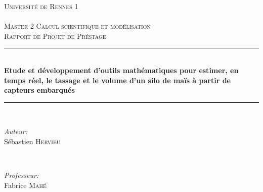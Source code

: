 \documentclass[12pt,a4paper]{report}
\author{Sébastien Hervieu}
\begin{document}
\begin{titlepage}

\newcommand{\HRule}{\rule{\linewidth}{0.5mm}} %

\center %
 

\textsc{\LARGE Université de Rennes 1}\\[1cm] 
\textsc{\Large }\\[0.5cm] %
\textsc{\large Master 2 Calcul scientifique et modélisation}\\
\textsc{Rapport de Projet de Préstage}\\

\HRule \\[0.4cm]
{ \huge \bfseries Etude et développement d’outils mathématiques pour estimer, en temps réel, le tassage et le volume d’un silo de maïs à partir de capteurs embarqués}\\[0.4cm] 
\HRule \\[1.5cm]
 

\begin{minipage}{0.4\textwidth}
\begin{flushleft} \large
\emph{Auteur:}\\
Sébastien \textsc{Hervieu}
\end{flushleft}
\end{minipage}
~
\begin{minipage}{0.4\textwidth}
\begin{flushright} \large
\emph{Professeur:} \\
Fabrice \textsc{Mahé} 
\end{flushright}
\end{minipage}\\[1cm]



\end{titlepage}
\end{document}
